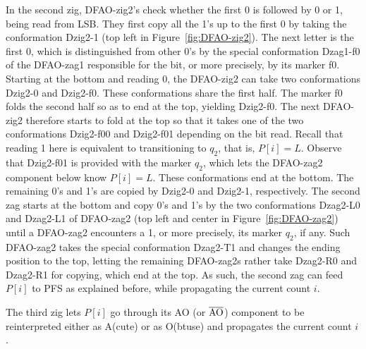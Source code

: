 In the second zig, DFAO-zig2's check whether the first 0 is followed by 0 or 1, being read from LSB.
They first copy all the 1's up to the first 0 by taking the conformation Dzig2-1 (top left in Figure~\ref{fig:DFAO-zig2}).
The next letter is the first 0, which is distinguished from other 0's by the special conformation Dzag1-f0 of the DFAO-zag1 responsible for the bit, or more precisely, by its marker f0. 
Starting at the bottom and reading 0, the DFAO-zig2 can take two conformations Dzig2-0 and Dzig2-f0.
These conformations share the first half.
The marker f0 folds the second half so as to end at the top, yielding Dzig2-f0. 
The next DFAO-zig2 therefore starts to fold at the top so that it takes one of the two conformations Dzig2-f00 and Dzig2-f01 depending on the bit read.
Recall that reading 1 here is equivalent to transitioning to $q_2$, that is, $P[i] = L$.
Observe that Dzig2-f01 is provided with the marker $q_2$, which lets the DFAO-zag2 component below know $P[i] = L$. 
These conformations end at the bottom.
The remaining 0's and 1's are copied by Dzig2-0 and Dzig2-1, respectively.
The second zag starts at the bottom and copy 0's and 1's by the two conformations Dzag2-L0 and Dzag2-L1 of DFAO-zag2 (top left and center in Figure~\ref{fig:DFAO-zag2}) until a DFAO-zag2 encounters a 1, or more precisely, its marker $q_2$, if any. 
Such DFAO-zag2 takes the special conformation Dzag2-T1 and changes the ending position to the top, letting the remaining DFAO-zag2s rather take Dzag2-R0 and Dzag2-R1 for copying, which end at the top.
As such, the second zag can feed $P[i]$ to PFS as explained before, while propagating the current count $i$.

The third zig lets $P[i]$ go through its AO (or $\overline{\rm AO}$) component to be reinterpreted either as A(cute) or as O(btuse) and propagates the current count $i$.   



